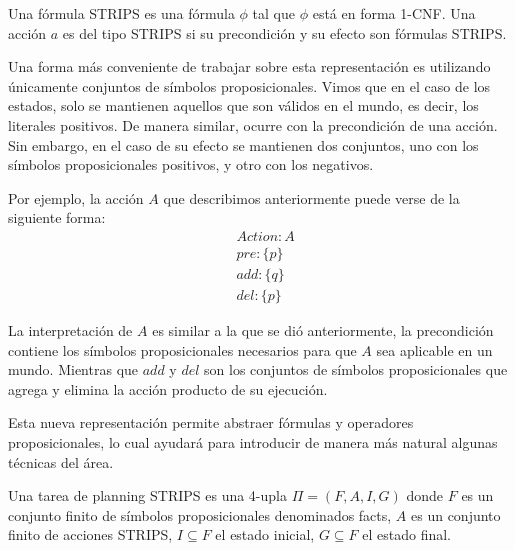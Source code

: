 \begin{mydef}
    Una fórmula STRIPS es una fórmula $\phi$ tal que $\phi$ está en forma 1-CNF.
    Una acción $a$ es del tipo STRIPS si su precondición y su efecto son fórmulas
    STRIPS.
\end{mydef}

Una forma más conveniente de trabajar sobre esta representación es utilizando
únicamente conjuntos de símbolos proposicionales. Vimos que en el caso de los
estados, solo se mantienen aquellos que son válidos en el mundo, es decir, los
literales positivos. De manera similar, ocurre con la precondición de una
acción. Sin embargo, en el caso de su efecto se mantienen dos conjuntos, uno
con los símbolos proposicionales positivos, y otro con los negativos.

Por ejemplo, la acción $A$ que describimos anteriormente puede verse
de la siguiente forma:
\begin{align*}
    & Action : A \\
    & pre : \{ p \}\\
    & add : \{ q \}\\
    & del : \{ p \}
\end{align*}

La interpretación de $A$ es similar a la que se dió anteriormente, la
precondición contiene los símbolos proposicionales necesarios para que $A$ sea
aplicable en un mundo. Mientras que $add$ y $del$ son los conjuntos de símbolos
proposicionales que agrega y elimina la acción producto de su ejecución.

Esta nueva representación permite abstraer fórmulas y operadores
proposicionales, lo cual ayudará para introducir de manera más natural algunas
técnicas del área.

\begin{mydef}
    Una tarea de planning STRIPS es una 4-upla $\Pi = (F, A, I, G)$ donde $F$ es
    un conjunto finito de símbolos proposicionales denominados facts, $A$ es un
    conjunto finito de acciones STRIPS, $I \subseteq F$ el estado inicial, $G
    \subseteq F$ el estado final.
\end{mydef}

